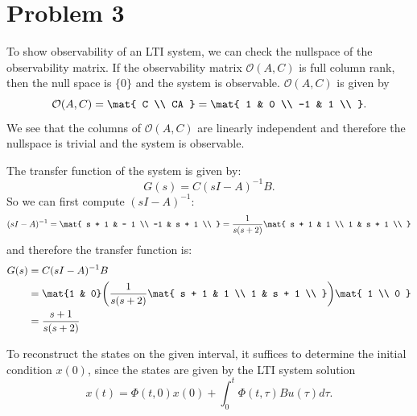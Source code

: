 \documentclass{homework}
\newcommand{\obs}{\mathcal{O}}
\begin{document}
\section{Problem 3}

\begin{letterenum}

\item To show observability of an LTI system, we can check the nullspace
of the observability matrix. If the observability matrix $\obs(A, C)$ is
full column rank, then the null space is $\{0\}$ and the system is 
observable. $\obs(A, C)$ is given by
\begin{equation*}
    \obs(A, C) = \mat{
        C \\ CA
    } = \mat{
        1 & 0 \\
        -1 & 1 \\
    }.
\end{equation*}
We see that the columns of $\obs(A, C)$ are linearly independent and
therefore the nullspace is trivial and the system is observable.

\item The transfer function of the system is given by:
\begin{equation*}
    G(s) = C(sI - A)^{-1} B.
\end{equation*}
So we can first compute $(sI - A)^{-1}$:
\begin{equation*}
    (sI - A)^{-1} = \mat{
        s + 1 & - 1 \\
        -1 & s + 1 \\
    } = \frac{1}{s(s+2)} \mat{
        s + 1 & 1 \\
        1 & s + 1 \\
    }
\end{equation*}
and therefore the transfer function is:
\begin{align*}
    G(s) &= C (sI - A)^{-1} B \\
        &= \mat{1 & 0} \biggl(
            \frac{1}{s(s+2)} \mat{
                s + 1 & 1 \\
                1 & s + 1 \\
            }
        \biggr) \mat{
            1 \\ 0
        } \\
        &= \frac{s + 1}{s(s+2)}
\end{align*}

\item To reconstruct the states on the given interval, it suffices to 
determine the initial condition $x(0)$, since the states are given
by the LTI system solution
\begin{equation}
    x(t) = \Phi(t, 0) x(0) + \int_{0}^{t} \Phi(t, \tau) B u(\tau) d\tau.
    \label{eq:system-solution}
\end{equation}


\end{letterenum}
\end{document}
